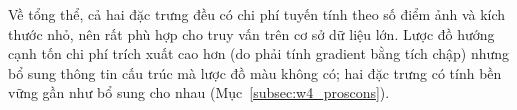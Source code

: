 Về tổng thể, cả hai đặc trưng đều có chi phí tuyến tính theo số điểm ảnh và kích thước nhỏ, nên rất phù hợp cho truy vấn trên cơ sở dữ liệu lớn. Lược đồ hướng cạnh tốn chi phí trích xuất cao hơn (do phải tính gradient bằng tích chập) nhưng bổ sung thông tin cấu trúc mà lược đồ màu không có; hai đặc trưng có tính bền vững gần như bổ sung cho nhau (Mục~\ref{subsec:w4_proscons}).
